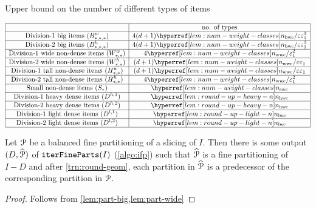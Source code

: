 \begin{table}[htb]
\centering
\caption{Upper bound on the number of different types of items}
${\displaystyle \begin{array}[t]{*3{|>{\displaystyle}c}|}
\hline & \textrm{no. of types}
\\ \hline \textrm{Division-1 big items } (B^w_{*,*,*})
    & 4(d+1)\nbwcHyp/\eps\epsLarge^3
\\ \hline \textrm{Division-2 big items } (B^h_{*,*,*})
    & 4(d+1)\nbwcHyp/\eps\epsLarge^3
\\ \hline \textrm{Division-1 wide non-dense items } (W^w_{*,*})
    & 4\nwwcHyp/\epsLarge^2
\\ \hline \textrm{Division-2 wide non-dense items } (W^h_{*,*})
    & (d+1)\nwwcHyp/\eps\epsLarge
\\ \hline \textrm{Division-1 tall non-dense items } (H^w_{*,*})
    & (d+1)\nwwcHyp/\eps\epsLarge
\\ \hline \textrm{Division-2 tall non-dense items } (H^h_{*,*})
    & 4\nwwcHyp/\epsLarge^2
\\ \hline \textrm{Small non-dense items } (S_{*})
    & \nswcHyp
\\ \hline \textrm{Division-1 heavy dense items } (D^{h,1})
    & \nhwcHyp
\\ \hline \textrm{Division-2 heavy dense items } (D^{h,2})
    & \nhwcHyp
\\ \hline \textrm{Division-1 light dense items } (D^{l,1})
    & \nlwcHyp
\\ \hline \textrm{Division-2 light dense items } (D^{l,2})
    & \nlwcHyp
\\ \hline
\end{array} }$
\label{table:item-types}
\end{table}

\begin{lemma}
\label{lem:ifp}
Let $\mathcal{P}$ be a balanced fine partitioning of a slicing of $I$.
Then there is some output $(D, \widehat{\mathcal{P}})$ of $\operatorname{\mathtt{iterFineParts}}(I)$ (\cref{algo:ifp}) such that
$\widehat{\mathcal{P}}$ is a fine partitioning of $I-D$ and
after \cref{trn:round-geom}, each partition in $\widehat{\mathcal{P}}$
is a predecessor of the corresponding partition in $\mathcal{P}$.
\end{lemma}
\begin{proof}
Follows from \cref{lem:part-big,lem:part-wide}
\end{proof}

